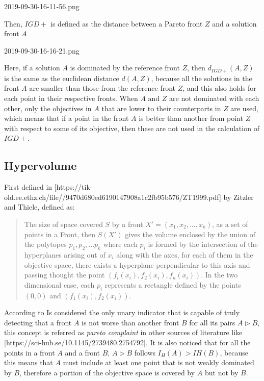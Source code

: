 
2019-09-30-16-11-56.png

Then, $IGD+$ is defined as the distance between a Pareto front $Z$ and a solution front $A$  


2019-09-30-16-16-21.png

Here, if a solution $A$ is dominated by the reference front $Z$, then $d_{IGD+}(A,Z)$ is the same as the euclidean distance $d(A,Z)$, because all the solutions in the front $A$ are smaller than those from the reference front $Z$, and this also holds for each point in their respective fronts. When $A$ and $Z$ are not dominated with each other, only the objectives in $A$ that are lower to their counterparts in $Z$ are used, which means that if a point in the front $A$ is better than another from point $Z$ with respect to some of its objective, then these are not used in the calculation of $IGD+$.

\subsection{Hypervolume}

First defined in [https://tik-old.ee.ethz.ch/file//9470d680ed6190147908a1c2fb95b576/ZT1999.pdf] by Zitzler and Thiele, defined as:

\begin{quote}
The size of space covered $S$ by a front $X' = (x_1, x_2,...,x_k)$, as a set of points in a Front, then $S(X')$ gives the volume enclosed by the union of the polytopes $p_1, p_2,... p_k$ where each $p_i$ is formed by the intersection of the hyperplanes arising out of ${x_i}$ along with the axes, for each of them in the objective space, there exists a hyperplane perpendicular to this axis and passing thought the point $(f_i(x_i), f_2(x_i), f_n(x_i))$. In the two dimensional case, each $p_i$ represents a rectangle defined by the points $(0,0)$ and $(f_1(x_i),f_2(x_i))$.
\end{quote}

According to 
Is considered the only unary indicator that is capable of truly detecting that a front $A$ is not worse than another front $B$ for all its pairs $A\triangleright B $, this concept is referred as \textit{pareto complaint} in other sources of literature like 
[https://sci-hub.se/10.1145/2739480.2754792]. It is also noticed that for all the points in a front $A$ and a front $B$, $A \triangleright B $ follows $I_H(A) > IH(B)$, because this means that $A$ must include at least one point that is not weakly dominated by $B$, therefore a portion of the objective space is covered by $A$ but not by $B$.

